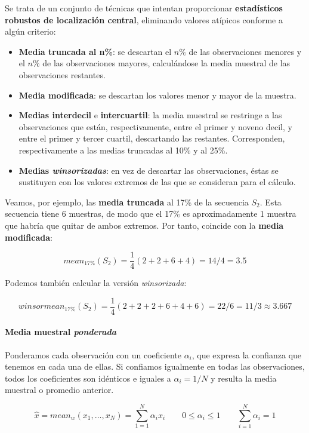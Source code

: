 \documentclass[11pt]{article}
\providecommand{\tightlist}{%
      \setlength{\itemsep}{0pt}\setlength{\parskip}{0pt}}
\begin{document}
Se trata de un conjunto de técnicas que intentan proporcionar
\textbf{estadísticos robustos de localización central}, eliminando
valores atípicos conforme a algún criterio:

\begin{itemize}
\tightlist
\item
  \textbf{Media truncada al n\%}: se descartan el \(n\%\) de las
  observaciones menores y el \(n\%\) de las observaciones mayores,
  calculándose la media muestral de las observaciones restantes.
\item
  \textbf{Media modificada}: se descartan los valores menor y mayor de
  la muestra.
\item
  \textbf{Medias interdecil} e \textbf{intercuartil}: la media muestral
  se restringe a las observaciones que están, respectivamente, entre el
  primer y noveno decil, y entre el primer y tercer cuartil, descartando
  las restantes. Corresponden, respectivamente a las medias truncadas al
  10\% y al 25\%.
\item
  \textbf{Medias \emph{winsorizadas}}: en vez de descartar las
  observaciones, éstas se sustituyen con los valores extremos de las que
  se consideran para el cálculo.
\end{itemize}

    Veamos, por ejemplo, las \textbf{media truncada} al 17\% de la secuencia
\(S_2\). Esta secuencia tiene 6 muestras, de modo que el 17\% es
aproximadamente 1 muestra que habría que quitar de ambos extremos. Por
tanto, coincide con la \textbf{media modificada}:

\[mean_{17\%}(S_2) = \frac{1}{4}(2+2+6+4)=14/4 = 3.5\]

Podemos también calcular la versión \emph{winsorizada}:

\[winsormean_{17\%}(S_2) = \frac{1}{4}(2+2+2+6+4+6)=22/6 = 11/3 \approx 3.667\]

    \paragraph{\texorpdfstring{Media muestral
\emph{ponderada}}{Media muestral ponderada}}\label{media-muestral-ponderada}

Ponderamos cada observación con un coeficiente \(\alpha_i\), que expresa
la confianza que tenemos en cada una de ellas. Si confiamos igualmente
en todas las observaciones, todos los coeficientes son idénticos e
iguales a \(\alpha_i = 1/N\) y resulta la media muestral o promedio
anterior.

\[\hat x = mean_w(x_1,\ldots, x_N) = \sum_{1=1}^N \alpha_i x_i \qquad 0\leq\alpha_i \leq1 \qquad \sum_{i=1}^N \alpha_i = 1\]
\end{document}
